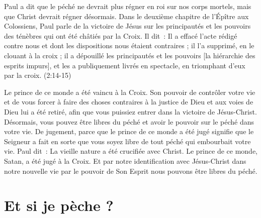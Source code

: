 Paul a dit que le péché ne devrait plus régner en roi sur nos corps mortels,
 mais que Christ devrait régner désormais.
 Dans le deuxième chapitre de l'Épître aux Colossiens,
 Paul parle de la victoire de Jésus sur les principautés et les pouvoirs
 des ténèbres qui ont été châtiés par la Croix. Il dit~:
 \og Il a effacé l'acte rédigé contre nous et dont les dispositions
 nous étaient contraires ; il l'a supprimé, en le clouant à la croix ;
 il a dépouillé les principautés et les pouvoirs
 [la hiérarchie des esprits impurs],
 et les a publiquement livrés en spectacle, en triomphant d'eux
 par la croix.  \fg{} (2:14-15)

Le prince de ce monde a été vaincu à la Croix.
 Son pouvoir de contrôler votre vie et de vous forcer à faire des choses
 contraires à la justice de Dieu et aux voies de Dieu lui a été retiré,
 afin que vous puissiez entrer dans la victoire de Jésus-Christ.
 Désormais, vous pouvez être libres du péché et avoir le pouvoir
 sur le péché dans votre vie.
 \og De jugement, parce que le prince de ce monde a été jugé \fg{}
 signifie que le Seigneur a fait en sorte que vous soyez libre de tout péché
 qui embourbait votre vie. Paul dit~:
 \og La vieille nature a été crucifiée avec Christ. \fg{}
 Le prince de ce monde, Satan, a été jugé à la Croix.
 Et par notre identification avec Jésus-Christ dans notre nouvelle vie
 \ocadr par le pouvoir de Son Esprit \fcadr{}
 nous pouvons être libres du péché.

\section{Et si je p\`eche ?}

